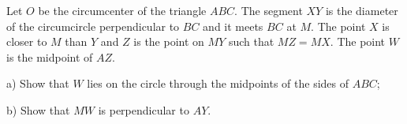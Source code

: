 Let $O$ be the circumcenter of the triangle $ABC$. The segment $XY$ is the diameter of the circumcircle perpendicular to $BC$ and it meets $BC$ at $M$. The point $X$ is closer to $M$ than $Y$ and $Z$ is the point on $MY$ such that $MZ = MX$. The point $W$ is the midpoint of $AZ$.

a) Show that $W$ lies on the circle through the midpoints of the sides of $ABC$;

b) Show that $MW$ is perpendicular to $AY$.